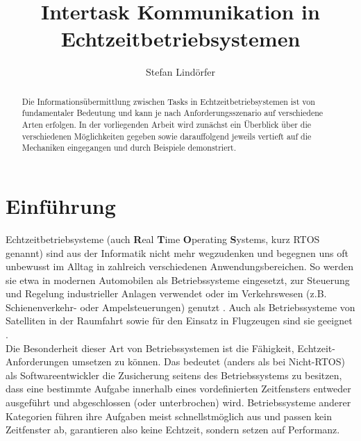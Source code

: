 \documentclass{llncs}
\begin{document}
\title{Intertask Kommunikation in Echtzeitbetriebsystemen}
\author{Stefan Lindörfer}

\date{}

\maketitle

\renewcommand{\abstractname}{Abstract}

\begin{abstract}
	Die Informationsübermittlung zwischen Tasks in Echtzeitbetriebsystemen ist von fundamentaler Bedeutung und kann je nach Anforderungsszenario auf verschiedene Arten erfolgen. In der vorliegenden Arbeit wird zunächst ein Überblick über die verschiedenen Möglichkeiten gegeben sowie darauffolgend jeweils vertieft auf die Mechaniken eingegangen und durch Beispiele demonstriert.
\end{abstract}

\section{Einführung}
Echtzeitbetriebsysteme (auch \textbf{R}eal \textbf{T}ime \textbf{O}perating \textbf{S}ystems, kurz RTOS genannt) sind aus der Informatik nicht mehr wegzudenken und begegnen uns oft unbewusst im Alltag in zahlreich verschiedenen Anwendungsbereichen. So werden sie etwa in modernen Automobilen als Betriebssysteme eingesetzt, zur Steuerung und Regelung industrieller Anlagen verwendet oder im Verkehrswesen (z.B. Schienenverkehr- oder Ampelsteuerungen) genutzt \autocite[vgl.][157]{Winzker2008}. Auch als Betriebssysteme von Satelliten in der Raumfahrt sowie für den Einsatz in Flugzeugen sind sie geeignet \autocite{Wuerzburg2019}.\\

Die Besonderheit dieser Art von Betriebssystemen ist die Fähigkeit, Echtzeit-Anforderungen umsetzen zu können. Das bedeutet (anders als bei Nicht-RTOS) als Softwareentwickler die Zusicherung seitens des Betriebssystems zu besitzen, dass eine bestimmte Aufgabe innerhalb eines vordefinierten Zeitfensters entweder ausgeführt und abgeschlossen (oder unterbrochen) wird. Betriebssysteme anderer Kategorien führen ihre Aufgaben meist schnellstmöglich aus und passen kein Zeitfenster ab, garantieren also keine Echtzeit, sondern setzen auf Performanz.\\
\end{document}
